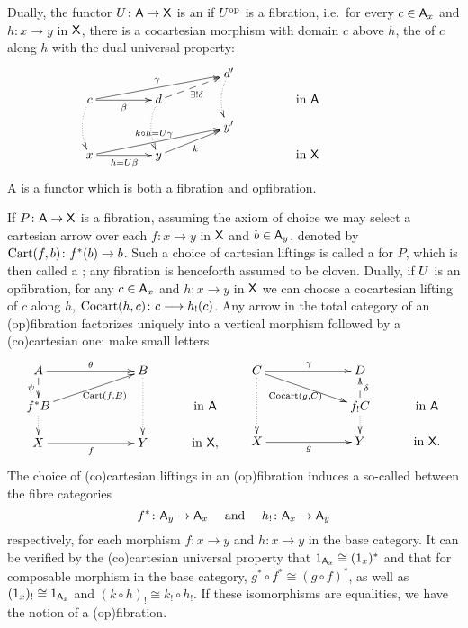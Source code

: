 \documentclass{amsart}
\begin{document}
Dually, the functor $U \colon \mathsf{A} \to \mathsf{X}$ is an  if $U^\mathrm{op}$ is a fibration, i.e.\ for every $c \in \mathsf{A} _x$ and $h \colon x \to y$ in $\mathsf{X}$, there is a cocartesian morphism with domain $c$ above $h$, the  of $c$ along $h$ with the dual universal property:
\begin{equation}\label{eq:opfibration}
\xymatrix @R=.1in @C=.6in
{&& d'\ar @{.>}@/_/[dd] &&\\
c\ar[r]_-{\beta} \ar @{.>}@/_/[dd]
\ar[urr]^-{\gamma} & 
d \ar @{.>}@/_/[dd] \ar @{-->}[ur]_-{\exists! \delta}
&& \textrm{in }\A\\
&& y' &&\\
x\ar[r]_-{h=\U\beta} \ar[urr]^-{k\circ h=\U\gamma}
 & y \ar[ur]_-k && \textrm{in }\X}
\end{equation}
A  is a functor which is both a fibration and opfibration.

If $P\colon \mathsf{A} \to\mathsf{X}$ is a fibration, assuming the axiom of choice we may select a cartesian arrow over each $f\colon x\to y$ in $\mathsf{X}$ and $b\in\mathsf{A} _y$, denoted by $\mathrm{Cart}(f,b)\colon f^*(b)\to b$. Such a choice of cartesian liftings is called a  for $P$, which is then called a ; any fibration is henceforth assumed to be cloven. Dually, if $U$ is an opfibration, for any $c\in\mathsf{A} _x$ and $h \colon x \to y$ in $\mathsf{X}$ we can choose a cocartesian lifting of $c$ along $h$, $\mathrm{Cocart}(h,c)\colon c\longrightarrow h_!(c)$. 
Any arrow in the total category of an (op)fibration factorizes uniquely into
a vertical morphism followed by a (co)cartesian one: {\chris make small letters}
\begin{equation}\label{factor}
\xymatrix @C=.4in @R=.2in
{A\ar[rr]^\theta\ar @{-->}[d]_-{\psi} && B \ar @{.>}[dd] &\\
f^*B\ar[urr]_-{\;\Cart(f,B)} \ar @{.>}[d] &&& \textrm{in }\A  \\
X\ar[rr]_-{f} && Y & \textrm{in }\X,}\qquad
\xymatrix @C=.4in @R=.2in
{C \ar @{.>}[dd]\ar[rr]^\gamma \ar[drr]_-{\Cocart(g,C)} && D &\\
&& f_!C \ar @{-->}[u]_-{\delta} \ar @{.>}[d] & \textrm{in }\A  \\
X\ar[rr]_-{g} && Y & \textrm{in }\X.}
\end{equation}
The choice of (co)cartesian liftings in an (op)fibration induces a so-called  between the fibre categories
\begin{equation}\label{reindexing}
    f^*\colon \mathsf{A} _y\to\mathsf{A} _x\quad\textrm{ and }\quad h_!\colon\mathsf{A} _x\to\mathsf{A} _y
\end{equation}
respectively, for each morphism $f\colon x\to y$ and $h\colon x\to y$ in the base category.
It can be verified by the (co)cartesian universal property that $1_{\mathsf{A} _x}\cong(1_x)^*$ 
and that for composable morphism in the base category, $g^*\circ f^*\cong(g\circ f)^* $, as well as $(1_x)_!\cong1_{\mathsf{A}_x}$ and $(k\circ h)_!\cong k_!\circ h_!$. If these isomorphisms are equalities, we have the notion of a  (op)fibration.
\end{document}
